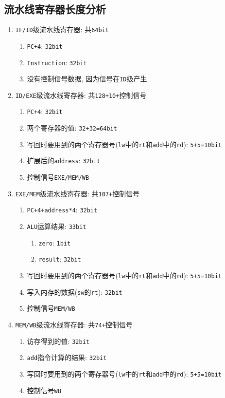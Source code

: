 \subsection{流水线寄存器长度分析}
\begin{enumerate}
\item \verb|IF/ID|级流水线寄存器: 共\verb|64bit|
\begin{enumerate}
\item \verb|PC+4|: \verb|32bit|
\item \verb|Instruction|: \verb|32bit|
\item 没有控制信号数据, 因为信号在\verb|ID|级产生
\end{enumerate}
\item \verb|ID/EXE|级流水线寄存器: 共\verb|128+10+|控制信号
\begin{enumerate}
\item \verb|PC+4|: \verb|32bit|
\item 两个寄存器的值: \verb|32+32=64bit|
\item 写回时要用到的两个寄存器号(\verb|lw|中的\verb|rt|和\verb|add|中的\verb|rd|): \verb|5+5=10bit|
\item 扩展后的\verb|address|: \verb|32bit|
\item 控制信号\verb|EXE/MEM/WB|
\end{enumerate}
\item \verb|EXE/MEM|级流水线寄存器: 共\verb|107+|控制信号
\begin{enumerate}
\item \verb|PC+4+address*4|: \verb|32bit|
\item \verb|ALU|运算结果: \verb|33bit|
\begin{enumerate}
\item \verb|zero|: \verb|1bit|
\item \verb|result|: \verb|32bit|
\end{enumerate}
\item 写回时要用到的两个寄存器号(\verb|lw|中的\verb|rt|和\verb|add|中的\verb|rd|): \verb|5+5=10bit|
\item 写入内存的数据(\verb|sw|的\verb|rt|): \verb|32bit|
\item 控制信号\verb|MEM/WB|
\end{enumerate}
\item \verb|MEM/WB|级流水线寄存器: 共\verb|74+|控制信号
\begin{enumerate}
\item 访存得到的值: \verb|32bit|
\item \verb|add|指令计算的结果: \verb|32bit|
\item 写回时要用到的两个寄存器号(\verb|lw|中的\verb|rt|和\verb|add|中的\verb|rd|): \verb|5+5=10bit|
\item 控制信号\verb|WB|
\end{enumerate}
\end{enumerate}







